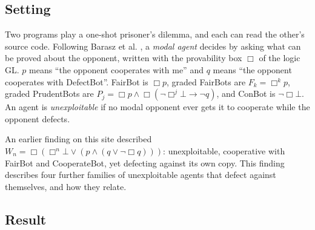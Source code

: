 \documentclass{article}
\begin{document}
\subsection*{Setting}

Two programs play a one-shot prisoner's dilemma, and each can read the other's source code.
Following Barasz et al. \cite{barasz2014robust}, a \emph{modal agent} decides by asking what can be proved
about the opponent, written with the provability box $\Box$ of the logic GL. $p$ means ``the
opponent cooperates with me'' and $q$ means ``the opponent cooperates with DefectBot''. FairBot is
$\Box p$, graded FairBots are $F_k = \Box^k p$, graded PrudentBots are
$P_j = \Box p \wedge \Box(\neg\Box^j\bot \to \neg q)$, and ConBot is $\neg\Box\bot$. An agent is
\emph{unexploitable} if no modal opponent ever gets it to cooperate while the opponent defects.

An earlier finding on this site described $W_n = \Box(\Box^n\bot \vee (p \wedge (q \vee \neg\Box q)))$: unexploitable, cooperative with FairBot and CooperateBot, yet defecting against
its own copy. This finding describes four further families of unexploitable agents that defect against
themselves, and how they relate.

\subsection*{Result}
\end{document}
